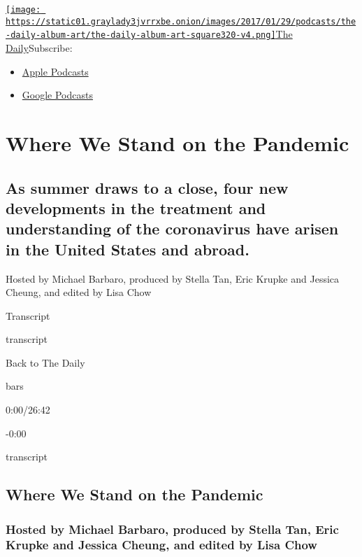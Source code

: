 \href{https://www.nytimes3xbfgragh.onion/column/the-daily}{\texttt{[image: https://static01.graylady3jvrrxbe.onion/images/2017/01/29/podcasts/the-daily-album-art/the-daily-album-art-square320-v4.png]}The
Daily}Subscribe:

\begin{itemize}
\tightlist
\item
  \href{https://itunes.apple.com/us/podcast/id1200361736}{Apple
  Podcasts}
\item
  \href{https://www.google.com/podcasts?feed=aHR0cHM6Ly9yc3MuYXJ0MTkuY29tL3RoZS1kYWlseQ\%3D\%3D}{Google
  Podcasts}
\end{itemize}

\hypertarget{where-we-stand-on-the-pandemic-1}{%
\section{Where We Stand on the
Pandemic}\label{where-we-stand-on-the-pandemic-1}}

\hypertarget{as-summer-draws-to-a-close-four-new-developments-in-the-treatment-and-understanding-of-the-coronavirus-have-arisen-in-the-united-states-and-abroad-1}{%
\subsection{As summer draws to a close, four new developments in the
treatment and understanding of the coronavirus have arisen in the United
States and
abroad.}\label{as-summer-draws-to-a-close-four-new-developments-in-the-treatment-and-understanding-of-the-coronavirus-have-arisen-in-the-united-states-and-abroad-1}}

Hosted by Michael Barbaro, produced by Stella Tan, Eric Krupke and
Jessica Cheung, and edited by Lisa Chow

Transcript

transcript

Back to The Daily

bars

0:00/26:42

-0:00

transcript

\hypertarget{where-we-stand-on-the-pandemic-2}{%
\subsection{Where We Stand on the
Pandemic}\label{where-we-stand-on-the-pandemic-2}}

\hypertarget{hosted-by-michael-barbaro-produced-by-stella-tan-eric-krupke-and-jessica-cheung-and-edited-by-lisa-chow-1}{%
\subsubsection{Hosted by Michael Barbaro, produced by Stella Tan, Eric
Krupke and Jessica Cheung, and edited by Lisa
Chow}\label{hosted-by-michael-barbaro-produced-by-stella-tan-eric-krupke-and-jessica-cheung-and-edited-by-lisa-chow-1}}

